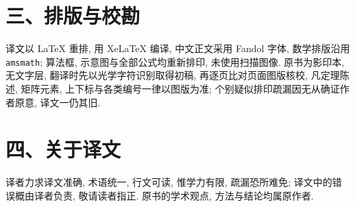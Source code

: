 \section*{三、排版与校勘}

译文以 \LaTeX{} 重排, 用 XeLaTeX 编译, 中文正文采用 Fandol 字体, 数学排版沿用 \texttt{amsmath}; 算法框, 示意图与全部公式均重新排印, 未使用扫描图像. 原书为影印本, 无文字层, 翻译时先以光学字符识别取得初稿, 再逐页比对页面图版核校, 凡定理陈述, 矩阵元素, 上下标与各类编号一律以图版为准; 个别疑似排印疏漏因无从确证作者原意, 译文一仍其旧.

\section*{四、关于译文}

译者力求译文准确, 术语统一, 行文可读, 惟学力有限, 疏漏恐所难免; 译文中的错误概由译者负责, 敬请读者指正. 原书的学术观点, 方法与结论均属原作者.

\vspace{0.8em}
